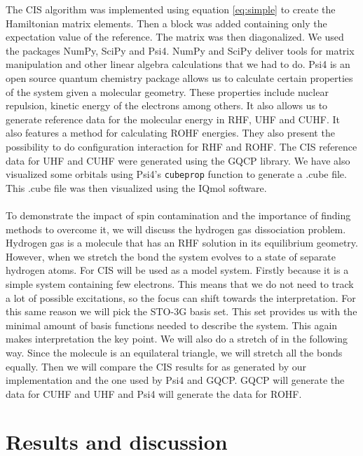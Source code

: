 \documentclass[twoside,twocolumn,9pt]{article}
\begin{document}
The CIS algorithm was implemented using equation \eqref{eq:simple} to create the Hamiltonian matrix elements. Then a block was added containing only the expectation value of the
reference. The matrix was then diagonalized.
We used the packages NumPy\cite{Numpy}, SciPy\cite{Scipy} and Psi4\cite{Psi4}. NumPy and SciPy deliver tools for matrix manipulation
and other linear algebra calculations that we had to do. Psi4 is an open source quantum chemistry package allows us to calculate certain properties of the system given a molecular
geometry. These properties include nuclear repulsion, kinetic energy of the electrons among others. It also allows us to generate reference data for the molecular energy in RHF, UHF
and CUHF. It also features a method for calculating ROHF energies. They also present the possibility to do configuration interaction for RHF and ROHF. The CIS reference data for
UHF and CUHF were generated using the GQCP\cite{GQCP} library. We have also visualized some orbitals using Psi4's \lstinline{cubeprop} function to generate a .cube file. This .cube
file was then visualized using the IQmol software\cite{IQmol}.
\paragraph*{}
To demonstrate the impact of spin contamination and the importance of finding methods to overcome it, we will discuss the hydrogen gas dissociation problem\cite{Szabo1996}. Hydrogen
gas is a molecule that has an RHF solution in its equilibrium geometry. However, when we stretch the bond the system evolves to a state of separate hydrogen atoms. 
For CIS  will be used as a model system. Firstly because it is a simple system containing few electrons. This means that we do not need to track a lot of possible excitations,
so the focus can shift towards the interpretation. For this same reason we will pick the STO-3G basis set. This set provides us with the minimal amount of basis functions needed to
describe the system. This again makes interpretation the key point. We will also do a stretch of  in the following way. Since the molecule is an equilateral triangle, 
we will stretch all the bonds equally. Then we will compare the CIS results for  as generated by our implementation and the one used by Psi4 and GQCP.
GQCP will generate the data for CUHF and UHF and Psi4 will generate the data for ROHF.

\section{Results and discussion}
\label{sec:results}
\end{document}
